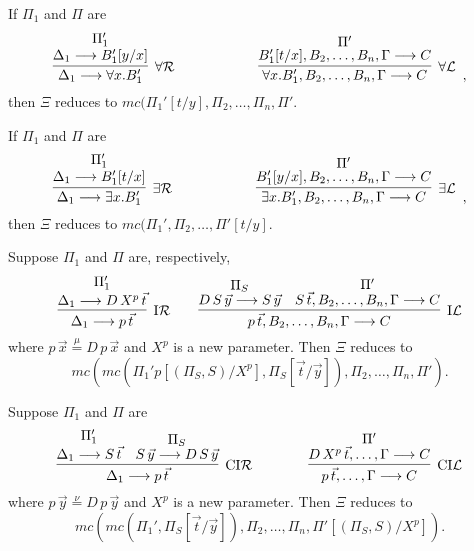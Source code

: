 \documentclass[preprint]{elsarticle}
\newcommand{\Seq}[2]{#1\longrightarrow #2}
\newcommand{\defmu}{\stackrel{\mu}{=}}
\newcommand{\defnu}{\stackrel{\nu}{=}}
\newcommand{\existsL}{\exists{\cal L}}
\newcommand{\existsR}{\exists{\cal R}}
\newcommand{\forallL}{\forall{\cal L}}
\newcommand{\forallR}{\forall{\cal R}}
\newcommand{\indR}{{\rm I}{\cal R}}
\newcommand{\indL}{{\rm I}{\cal L}}
\newcommand{\coindR}{{\rm CI}{\cal R}}
\newcommand{\coindL}{{\rm CI}{\cal L}}
\begin{document}
\begin{trivlist}
  \item[\fbox{$\forallR/\forallL$}] If $\Pi_1$ and $\Pi$ are
    \begin{displaymath}
      \infer[\forallR]{\Seq{\Delta_1}{\forall x.B_1'}}
      {\deduce{\Seq{\Delta_1}{B_1'[y/x]}}
        {\Pi_1'}}
      \qquad\qquad\qquad
      \infer[\forallL]{\Seq{\forall x.B_1',B_2,\ldots,B_n,\Gamma}{C}}
      {\deduce{\Seq{B_1'[t/x],B_2,\ldots,B_n,\Gamma}{C}}
        {\Pi'}}
      \enspace ,
    \end{displaymath}
    then $\Xi$ reduces to $mc(\Pi_1'[t/y],\Pi_2,\ldots,\Pi_n,\Pi'$.



  \item[\fbox{$\existsR/\existsL$}] If $\Pi_1$ and $\Pi$ are
    \begin{displaymath}
      \infer[\existsR]{\Seq{\Delta_1}{\exists x.B_1'}}
      {\deduce{\Seq{\Delta_1}{B_1'[t/x]}}
        {\Pi_1'}}
      \qquad\qquad\qquad
      \infer[\existsL]{\Seq{\exists x.B_1',B_2,\ldots,
          B_n,\Gamma}{C}}
      {\deduce{\Seq{B_1'[y/x],B_2,\ldots,B_n,
	    \Gamma}{C}}
        {\Pi'}}
      \enspace ,
    \end{displaymath}
    then $\Xi$ reduces to $mc(\Pi_1',\Pi_2,\ldots,\Pi'[t/y]$.



  \item[\fbox{$\indR/\indL$}] 
Suppose $\Pi_1$ and $\Pi$ are, respectively,  
$$
\infer[\indR]
{\Seq {\Delta_1}{p\,\vec t}}
{
 \deduce{\Seq{\Delta_1}{D\,X^p\,\vec t}}{\Pi_1'}
}
\qquad
\infer[\indL] {\Seq{p\,\vec{t}, B_2,\dots,B_n,\Gamma}{C}} {
  \deduce{\Seq{D\,S\,\vec{y}}{S\,\vec{y}}}{\Pi_S} &
  \deduce{\Seq{S\,\vec{t}, B_2,\dots,B_n, \Gamma} {C}}{\Pi'} }
$$
where $p\,\vec{x} \defmu D\,p\,\vec{x}$ and $X^p$ is a new
parameter.  Then $\Xi$ reduces to
$$
mc(mc(\Pi_1'p[(\Pi_S,S)/X^p], \Pi_S[\vec t/\vec y]), \Pi_2,\ldots,\Pi_n,\Pi').
$$



\item[\fbox{$\coindR/\coindL$}] Suppose $\Pi_1$ and $\Pi$ are 
$$
\infer[\coindR] 
{\Seq{\Delta_1}{p\,\vec{t}}} 
{
  \deduce{\Seq{\Delta_1}{S\,\vec{t}}}{\Pi_1'} &
  \deduce{\Seq{S\,\vec{y}}{D\,S\,\vec{y}}}{\Pi_S} 
} 
\qquad \qquad
\infer[\coindL] 
{\Seq{p\,\vec{t}, \dots, \Gamma}{C}}
{
  \deduce{\Seq{D\,X^p\,\vec{t},\dots, \Gamma}{C}}{\Pi'}
}
$$
where $p\,\vec y \defnu D\,p\,\vec y$ and $X^p$ is a new parameter.
Then $\Xi$ reduces to
$$
mc(mc(\Pi_1', \Pi_S[\vec t/\vec y]), \Pi_2,\ldots,\Pi_n,\Pi'[(\Pi_S,S)/X^p]).
$$





\end{trivlist}
\end{document}
